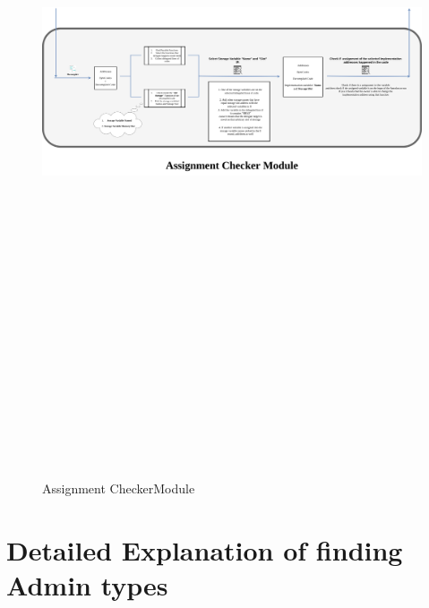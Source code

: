 \begin{figure}[t]
  \centering
  \includegraphics[keepaspectratio,height=22cm, width=30cm]{figures/Assignment_finder.png}\label{assignmentFinder}
  \caption{Assignment CheckerModule}
\end{figure}


\clearpage
\section{Detailed Explanation of finding Admin types}

